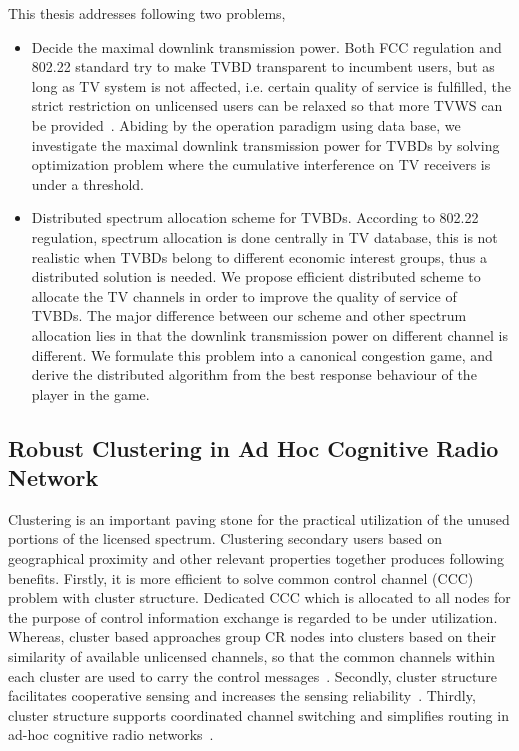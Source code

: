 This thesis addresses following two problems,
\begin{itemize}
\item Decide the maximal downlink transmission power.
Both FCC regulation and 802.22 standard try to make TVBD transparent to incumbent users, but as long as TV system is not affected, i.e. certain quality of service is fulfilled, the strict restriction on unlicensed users can be relaxed so that more TVWS can be provided~\cite{multipleIntf_pimrc11}. 
Abiding by the operation paradigm using data base, we investigate the maximal downlink transmission power for TVBDs by solving optimization problem where the cumulative interference on TV receivers is under a threshold.

\item Distributed spectrum allocation scheme for TVBDs.
According to 802.22 regulation, spectrum allocation is done centrally in TV database, this is not realistic when TVBDs belong to different economic interest groups, thus a distributed solution is needed.
We propose efficient distributed scheme to allocate the TV channels in order to improve the quality of service of TVBDs.
The major difference between our scheme and other spectrum allocation lies in that the downlink transmission power on different channel is different.
We formulate this problem into a canonical congestion game, and derive the distributed algorithm from the best response behaviour of the player in the game. 
\end{itemize}



\subsection{Robust Clustering in Ad Hoc Cognitive Radio Network}
Clustering is an important paving stone for the practical utilization of the unused portions of the licensed spectrum.
Clustering secondary users based on geographical proximity and other relevant properties together produces following benefits.
Firstly, it is more efficient to solve common control channel (CCC) problem with cluster structure.
Dedicated CCC which is allocated to all nodes for the purpose of control information exchange is regarded to be under utilization.
Whereas, cluster based approaches group CR nodes into clusters based on their similarity of available unlicensed channels, so that the common channels within each cluster are used to carry the control messages~\cite{Lazos09}.
Secondly, cluster structure facilitates cooperative sensing and increases the sensing reliability~\cite{Sun07_clustering_spectrum_secsing}.
Thirdly, cluster structure supports coordinated channel switching and simplifies routing in ad-hoc cognitive radio networks~\cite{cluster_routing_2013ICC}.


